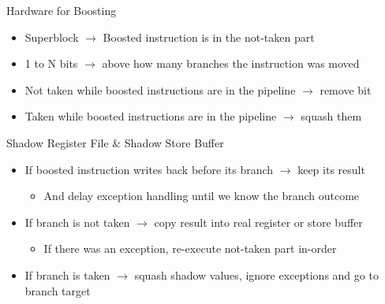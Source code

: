 \documentclass[presentation]{beamer}
\begin{document}
\begin{frame}{Hardware for Boosting}
   \begin{itemize}
       \item Superblock $\rightarrow$ Boosted instruction is in the not-taken part 
       \item 1 to N bits $\rightarrow$ above how many branches the instruction was moved
       \item Not taken while boosted instructions are in the pipeline $\rightarrow$ remove bit
       \item Taken while boosted instructions are in the pipeline $\rightarrow$ squash them
   \end{itemize} 
    \begin{block}{Shadow Register File \& Shadow Store Buffer~\cite{10.1145/325164.325160}}
        \begin{itemize}
       \item If boosted instruction writes back before its branch $\rightarrow$ keep its result
       \begin{itemize}
           \item And delay exception handling until we know the branch outcome
       \end{itemize}
       \item If branch is not taken $\rightarrow$ copy result into real register or store buffer
       \begin{itemize}
           \item If there was an exception, re-execute not-taken part in-order
       \end{itemize}
       \item If branch is taken $\rightarrow$ squash shadow values, ignore exceptions and go to branch target
   \end{itemize} 
    \end{block}
\end{frame}
\end{document}
